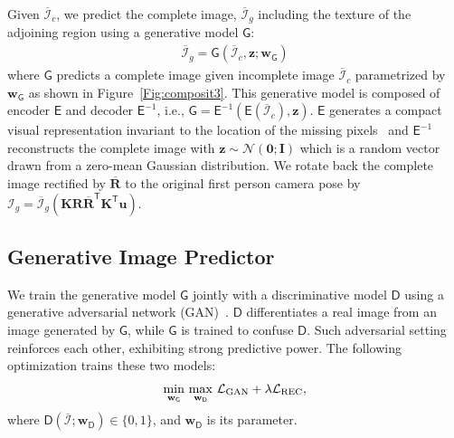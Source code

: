 \documentclass[10pt,twocolumn,letterpaper]{article}
\begin{document}

Given $\overline{\mathcal{I}}_c$, we predict the complete image, $\overline{\mathcal{I}}_g$ including the texture of the adjoining region using a generative model $\mathsf{G}$:
\begin{align}
\overline{\mathcal{I}}_g=\mathsf{G}(\overline{\mathcal{I}}_c, \mathbf{z}; \mathbf{w}_{\mathsf{G}}) 
\end{align} 
where $\mathsf{G}$ predicts a complete image given incomplete image $\overline{\mathcal{I}}_c$ parametrized by $\mathbf{w}_{\mathsf{G}}$ as shown in Figure~\ref{Fig:composit3}. This generative model is composed of encoder $\mathsf{E}$ and decoder $\mathsf{E}^{-1}$, i.e., $\mathsf{G}=\mathsf{E}^{-1} \left(\mathsf{E}\left(\overline{\mathcal{I}}_c\right), \mathbf{z}\right)$. $\mathsf{E}$ generates a compact visual representation invariant to the location of the missing pixels~\cite{pathakCVPR16context} and $\mathsf{E}^{-1}$ reconstructs the complete image with $\mathbf{z}\sim \mathcal{N}(\mathbf{0};\mathbf{I})$ which is a random vector drawn from a zero-mean Gaussian distribution. We rotate back the complete image rectified by $\overline{\mathbf{R}}$ to the original first person camera pose by $\mathcal{I}_g=\overline{\mathcal{I}}_g(\mathbf{K}\mathbf{R}\overline{\mathbf{R}}^{\mathsf{T}}\mathbf{K}^{\mathsf{T}}\mathbf{u})$. 






\subsection{Generative Image Predictor} \label{sec:gan}
We train the generative model $\mathsf{G}$ jointly with a discriminative model $\mathsf{D}$ using a generative adversarial network (GAN)~\cite{goodfellow:2014,pathakCVPR16context}. $\mathsf{D}$ differentiates a real image from an image generated by $\mathsf{G}$, while $\mathsf{G}$ is trained to confuse $\mathsf{D}$. Such adversarial setting reinforces each other, exhibiting strong predictive power. The following optimization trains these two models:
\begin{align}
 \underset{ \mathbf{w}_{\mathsf{G}}}{\operatorname{min}}~ \underset{ \mathbf{w}_{\mathsf{D}}}{\operatorname{max}}~ \mathcal{L}_{\rm GAN} + \lambda \mathcal{L}_{\rm REC},
\end{align}
where $\mathsf{D}(\overline{\mathcal{I}};\mathbf{w}_{\mathsf{D}})\in \{0,1\}$, and $\mathbf{w}_{\mathsf{D}}$ is its parameter. 
\end{document}
